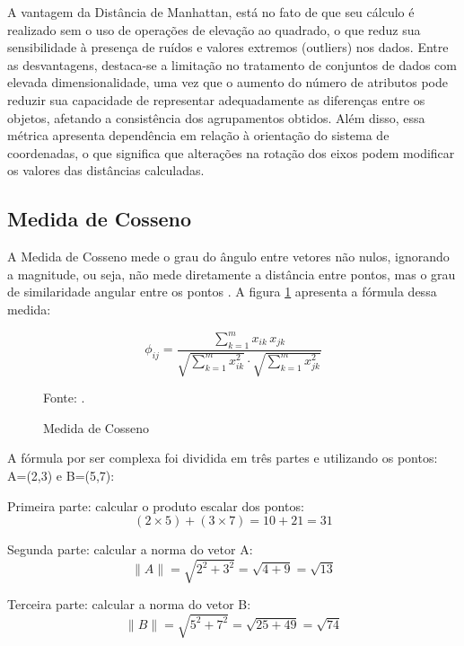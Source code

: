 \documentclass[10pt,a4paper,twocolumn]{article}
\begin{document}
A vantagem da Distância de Manhattan, está no fato de que seu cálculo é realizado sem o uso de operações de elevação ao quadrado, o que reduz sua sensibilidade à presença de ruídos e valores extremos (outliers) nos dados. Entre as desvantagens, destaca-se a limitação no tratamento de conjuntos de dados com elevada dimensionalidade, uma vez que o aumento do número de atributos pode reduzir sua capacidade de representar adequadamente as diferenças entre os objetos, afetando a consistência dos agrupamentos obtidos. Além disso, essa métrica apresenta dependência em relação à orientação do sistema de coordenadas, o que significa que alterações na rotação dos eixos podem modificar os valores das distâncias calculadas\cite{VelezFalconi2020}. 



\subsection{Medida de Cosseno} %
\label{sec:cosseno}

A Medida de Cosseno mede o grau do ângulo entre vetores não nulos, ignorando a magnitude, ou seja, não mede diretamente a distância entre pontos, mas o grau de similaridade angular entre os pontos \cite{AlKhamees2026}. A figura \ref{fig:cosseno} apresenta a fórmula dessa medida:

\begin{figure}[h!]
   \centering
      \[
         \phi_{ij} = \frac{\sum_{k=1}^{m} x_{ik} \, x_{jk}}
          {\sqrt{\sum_{k=1}^{m} x_{ik}^{2}} \cdot \sqrt{\sum_{k=1}^{m} x_{jk}^{2}}}
       \]
       \vspace{-0.7cm}
       \caption{Medida de Cosseno}
       \label{fig:cosseno}
       \vspace{0.0cm}
       {\small Fonte: \cite{Ferrari2016}.}
\end{figure}

A fórmula por ser complexa foi dividida em três partes e utilizando os pontos:  A=(2,3) e B=(5,7):

Primeira parte: calcular o produto escalar dos pontos:
\[
(2 \times 5) + (3 \times 7) = 10 + 21 = 31
\] 

Segunda parte: calcular a norma do vetor A:
\[
\|A\| = \sqrt{2^{2} + 3^{2}}
= \sqrt{4 + 9}
= \sqrt{13}
\] 

Terceira parte: calcular a norma do vetor B:
\[
\|B\| = \sqrt{5^{2} + 7^{2}}
= \sqrt{25 + 49}
= \sqrt{74}
\] 
\end{document}
